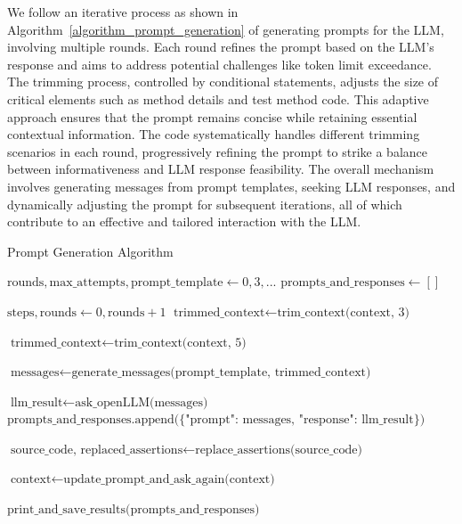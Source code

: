 We follow an iterative process as shown in Algorithm~\ref{algorithm_prompt_generation} of generating prompts for the LLM, involving multiple rounds. Each round refines the prompt based on the LLM's response and aims to address potential challenges like token limit exceedance. The trimming process, controlled by conditional statements, adjusts the size of critical elements such as method details and test method code. This adaptive approach ensures that the prompt remains concise while retaining essential contextual information. The code systematically handles different trimming scenarios in each round, progressively refining the prompt to strike a balance between informativeness and LLM response feasibility. The overall mechanism involves generating messages from prompt templates, seeking LLM responses, and dynamically adjusting the prompt for subsequent iterations, all of which contribute to an effective and tailored interaction with the LLM.

\begin{algorithm}
    \caption{Prompt Generation Algorithm}
    \label{algorithm_prompt_generation}
    \begin{algorithmic}[1]
            \State $\text{rounds}, \text{max\_attempts}, \text{prompt\_template} \gets 0, 3, \text{...}$
            \State $\text{prompts\_and\_responses} \gets []$
            
                \State $\text{steps}, \text{rounds} \gets 0, \text{rounds} + 1$
                    \State $\text{trimmed\_context} \gets \text{trim\_context(context, 3)}$
                \EndIf
                
                    \State $\text{trimmed\_context} \gets \text{trim\_context(context, 5)}$
                \EndIf
                
                \State $\text{messages} \gets \text{generate\_messages(prompt\_template, trimmed\_context)}$
                
                \State $\text{llm\_result} \gets \text{ask\_openLLM(messages)}$
                \State $\text{prompts\_and\_responses.append(\{"prompt": messages, "response": llm\_result\})}$
                
                \State $\text{source\_code, replaced\_assertions} \gets \text{replace\_assertions(source\_code)}$
                
                    \State $\text{context} \gets \text{update\_prompt\_and\_ask\_again(context)}$
                \EndIf
            \EndWhile
            
            \State $\text{print\_and\_save\_results(prompts\_and\_responses)}$
        \EndFunction
    \end{algorithmic}
\end{algorithm}

